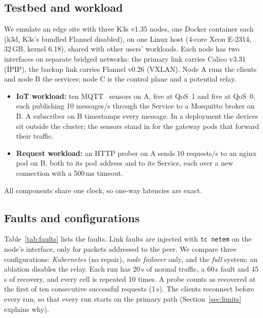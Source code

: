 \documentclass[conference,compsoc]{IEEEtran}
\begin{document}
\subsection{Testbed and workload}
We emulate an edge site with three K3s v1.35 nodes, one Docker container each (k3d,
K3s's bundled Flannel disabled), on one Linux host (4-core Xeon E-2314, 32\,GB, kernel
6.18), shared with other users' workloads. Each node has two interfaces on separate bridged networks: the primary link
carries Calico v3.31 (IPIP), the backup link carries Flannel v0.26 (VXLAN). Node A runs
the clients and node B the services; node C is the control plane and a potential relay.
\begin{itemize}
  \item \textbf{IoT workload:} ten MQTT~\cite{mqtt5} sensors on A, five at QoS~1 and
        five at QoS~0, each publishing 10 messages/s through the Service to a
        Mosquitto broker on B. A subscriber on B timestamps every message. In a
        deployment the devices sit outside the cluster; the sensors stand in for the
        gateway pods that forward their traffic.
  \item \textbf{Request workload:} an HTTP prober on A sends 10 requests/s to an
        nginx pod on B, both to its pod address and to its Service, each over a new
        connection with a 500\,ms timeout.
\end{itemize}
All components share one clock, so one-way latencies are exact.

\subsection{Faults and configurations}
Table~\ref{tab:faults} lists the faults. Link faults are injected with \texttt{tc
netem} on the node's interface, only for packets addressed to the peer. We compare
three configurations: \emph{Kubernetes} (no repair), \emph{node failover} only, and
the \emph{full} system; an ablation disables the relay. Each run has 20\,s of normal
traffic, a 60\,s fault and 45\,s of recovery, and every cell is repeated 10 times. A
probe counts as recovered at the first of ten consecutive successful requests (1\,s).
The clients reconnect before every run, so that every run starts on the primary path
(Section~\ref{sec:limits} explains why).
\end{document}
